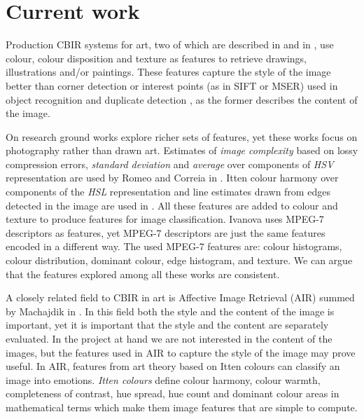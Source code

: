\documentclass[a4paper]{article}
\begin{document}
\section{Current work}

Production CBIR systems for art, two of which are described in \cite{cfsp12air}
and in \cite{ymvz03tree}, use colour, colour disposition and texture as
features to retrieve drawings, illustrations and/or paintings.  These features
capture the style of the image better than corner detection or interest points
(as in SIFT or MSER) used in object recognition and duplicate detection
\cite{szel11book}, as the former describes the content of the image.

On research ground works explore richer sets of features, yet these works focus
on photography rather than drawn art.  Estimates of \emph{image complexity}
based on lossy compression errors, \emph{standard deviation} and \emph{average}
over components of \emph{HSV} representation are used by Romeo and Correia in
\cite{jma12clas,cmrc13fs,rmc12ajs}.  Itten colour harmony over components of
the \emph{HSL} representation and line estimates drawn from edges detected in
the image are used in \cite{mach10clas}.  All these features are added to
colour and texture to produce features for image classification.  Ivanova
\cite{isv12mpeg} uses MPEG-7 descriptors as features, yet MPEG-7 descriptors
are just the same features encoded in a different way.  The used MPEG-7
features are: colour histograms, colour distribution, dominant colour, edge
histogram, and texture.  We can argue that the features explored among all
these works are consistent.

A closely related field to CBIR in art is Affective Image Retrieval (AIR)
summed by Machajdik in \cite{mach10ua,mach10clas}.  In this field both the
style and the content of the image is important, yet it is important that the
style and the content are separately evaluated.  In the project at hand we are
not interested in the content of the images, but the features used in AIR to
capture the style of the image may prove useful.  In AIR, features from art
theory based on Itten colours can classify an image into emotions.  \emph{Itten
colours} define colour harmony, colour warmth, completeness of contrast, hue
spread, hue count and dominant colour areas in mathematical terms which make
them image features that are simple to compute.

\end{document}
